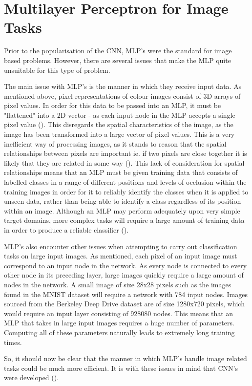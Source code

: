 \documentclass[12pt]{report}
\begin{document}
\section{Multilayer Perceptron for Image Tasks}
\begin{flushleft}
Prior to the popularisation of the CNN, MLP's were the standard for image based problems. However, there are several issues that make the MLP quite unsuitable for this type of problem.

\vspace{0.5cm}
The main issue with MLP's is the manner in which they receive input data. As mentioned above, pixel representations of colour images consist of 3D arrays of pixel values. In order for this data to be passed into an MLP, it must be "flattened" into a 2D vector - as each input node in the MLP accepts a single pixel value (\cite{ben1999fast}). This disregards the spatial characteristics of the image, as the image has been transformed into a large vector of pixel values. This is a very inefficient way of processing images, as it stands to reason that the spatial relationships between pixels are important ie. if two pixels are close together it is likely that they are related in some way (\cite{lecun1989backpropagation}). This lack of consideration for spatial relationships means that an MLP must be given training data that consists of labelled classes in a range of different positions and levels of occlusion within the training images in order for it to reliably identify the classes when it is applied to unseen data, rather than being able to identify a class regardless of its position within an image. Although an MLP may perform adequately upon very simple target domains, more complex tasks will require a large amount of training data in order to produce a reliable classifier (\cite{ghaith}).

\vspace{0.5cm}
MLP's also encounter other issues when attempting to carry out classification tasks on large input images. As mentioned, each pixel of an input image must correspond to an input node in the network. As every node is connected to every other node in its preceding layer, large images quickly require a large amount of nodes in the network. A small image of size 28x28 pixels such as the images found in the MNIST dataset will require a network with 784 input nodes. Images sourced from the Berkeley Deep Drive dataset are of size 1280x720 pixels, which would require an input layer consisting of 928080 nodes. This means that an MLP that takes in large input images requires a huge number of parameters. Computing all of these parameters naturally leads to extremely long training times.

\vspace{0.5cm}
So, it should now be clear that the manner in which MLP's handle image related tasks could be much more efficient. It is with these issues in mind that CNN's were developed (\cite{lecun1989backpropagation}).
\end{flushleft}
\end{document}
